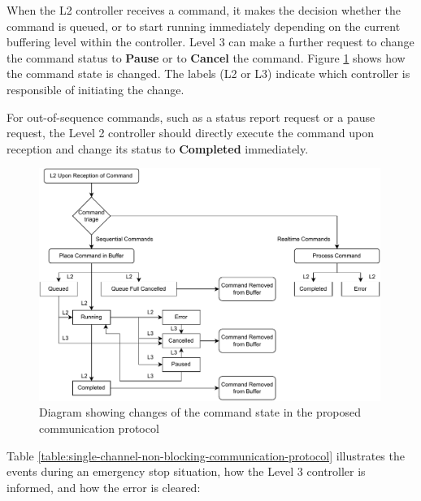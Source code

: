 When the L2 controller receives a command, it makes the decision whether the command is queued, or to start running immediately depending on the current buffering level within the controller. Level 3 can make a further request to change the command status to \textbf{Pause }or to \textbf{Cancel }the command. Figure \ref{fig:state-changes-of-a-command} shows how the command state is changed. The labels (L2 or L3) indicate which controller is responsible of initiating the change.

For out-of-sequence commands, such as a status report request or a pause request, the Level 2 controller should directly execute the command upon reception and change its status to \textbf{Completed }immediately.

\begin{figure}[!h]
    \centering
    \includegraphics[width=0.99\textwidth]{images/6a/command-buffer.pdf}
    \caption{Diagram showing changes of the command state in the proposed communication protocol}
    \label{fig:state-changes-of-a-command}
\end{figure}


Table \ref{table:single-channel-non-blocking-communication-protocol} illustrates the events during an emergency stop situation, how the Level 3 controller is informed, and how the error is cleared:

